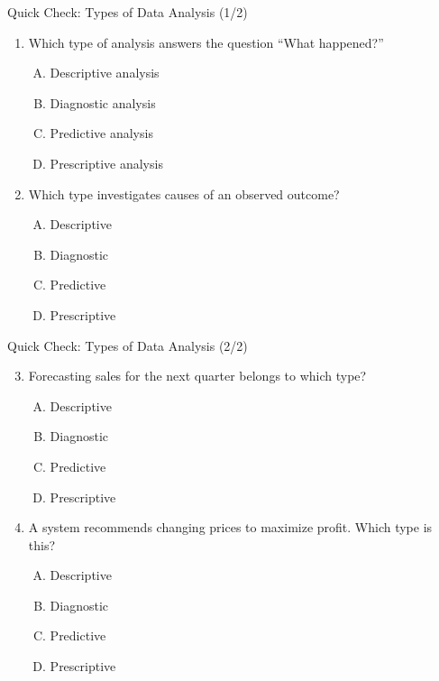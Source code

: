 \documentclass[aspectratio=169,11pt]{beamer}
\begin{document}
\begin{frame}{Quick Check: Types of Data Analysis (1/2)}
\begin{enumerate}
  \item Which type of analysis answers the question ``What happened?''
  \begin{enumerate}[A.]
    \item Descriptive analysis \item Diagnostic analysis \item Predictive analysis \item Prescriptive analysis
  \end{enumerate}
  \item Which type investigates causes of an observed outcome?
  \begin{enumerate}[A.]
    \item Descriptive \item Diagnostic \item Predictive \item Prescriptive
  \end{enumerate}
\end{enumerate}
\end{frame}

\begin{frame}{Quick Check: Types of Data Analysis (2/2)}
\begin{enumerate}\setcounter{enumi}{2}
  \item Forecasting sales for the next quarter belongs to which type?
  \begin{enumerate}[A.]
    \item Descriptive \item Diagnostic \item Predictive \item Prescriptive
  \end{enumerate}
  \item A system recommends changing prices to maximize profit. Which type is this?
  \begin{enumerate}[A.]
    \item Descriptive \item Diagnostic \item Predictive \item Prescriptive
  \end{enumerate}
\end{enumerate}
\end{frame}
\end{document}
